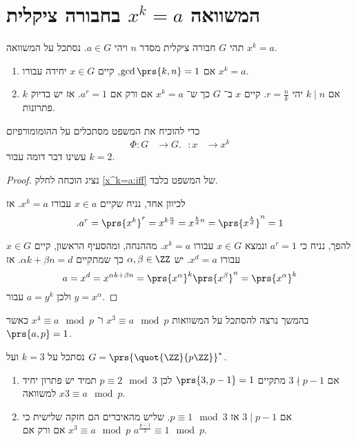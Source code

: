 \documentclass[a4paper,10pt,twoside,openany]{book}
\begin{document}
\section{המשוואה
$x^k = a$
בחבורה ציקלית}

\begin{theorem}
תהי
$G$
חבורה ציקלית מסדר
$n$
ויהי
$a \in G$.
נסתכל על המשוואה
$x^k = a$.
\begin{enumerate}
\item אם
$\gcd\prs{k,n} = 1$,
קיים
$x \in G$
יחידה עבורו
$x^k = a$.
\item אם
$k \mid n$
יהי
$r = \frac{n}{k}$.
קיים
$x$
ב־%
$G$
כך ש־%
$x^k = a$
אם ורק אם
$a^r = 1$.
אז יש בדיוק
$k$
פתרונות.
\label{x^k=a:iff}
\end{enumerate}
\end{theorem}

\begin{remark}
כדי להוכיח את המשפט מסתכלים על ההומומורפיזם
\begin{align*}
\Phi \colon G &\to G
\text{.} \phantom{\Phi} \colon x &\to x^k
\end{align*}
עשינו דבר דומה עבור
$k=2$.
\end{remark}
\begin{proof}
נציג הוכחה לחלק \ref{x^k=a:iff} של המשפט בלבד.

לכיוון אחד, נניח שקיים
$x \in a$
עבורו
$x^k = a$.
אז
\[\text{.}a^r = \prs{x^k}^r = x^{k \frac{n}{d}} = x^{\frac{k}{d}n} = \prs{x^{\frac{k}{d}}}^n = 1\]

להפך, נניח כי
$a^r = 1$
ונמצא
$x \in G$
עבורו
$x^k = a$.
מההנחה,
ומהסעיף הראשון, קיים
$x \in G$
עבורו
$x^d = a$.
יש
$\alpha,\beta \in \ZZ$
כך שמתקיים
$\alpha k +\beta n = d$.
אז
\[a = x^d = x^{\alpha k + \beta n} = \prs{x^{\alpha}}^k \prs{x^{\beta}}^n = \prs{x^{\alpha}}^k\]
ולכן
$a = y^k$
עבור
$y = x^{\alpha}$.
\end{proof}

בהמשך נרצה להסתכל על המשוואות
$x^3 \equiv a \mod{p}$
ו־%
$x^4 \equiv a \mod{p}$
כאשר
$\prs{a,p} = 1$.

\begin{example}
נסתכל על
$k = 3$
ועל
$G = \prs{\quot{\ZZ}{p\ZZ}}^*$.
\begin{enumerate}
\item אם
$3 \nmid p-1$
מתקיים
$\prs{3,p-1} = 1$
לכן
$p \equiv 2 \mod{3}$
תמיד יש פתרון יחיד למשוואה
$x3 \equiv a \mod{p}$.
\item אם 
$3 \mid p-1$
אז
$p \equiv 1\mod{3}$.
שליש מהאיברים הם חזקה שלישית כי
$x^3 \equiv a \mod{p}$
אם ורק אם
$a^{\frac{p-1}{3}} \equiv 1 \mod{p}$.
\end{enumerate}
\end{example}
\end{document}
